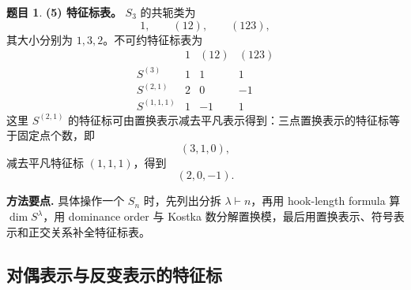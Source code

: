 \documentclass[a4paper]{ctexart}
\theoremstyle{definition}
\newtheorem{example}{题目}[section]
\theoremstyle{analysis}
\theoremstyle{plain}
\begin{document}
\begin{example}
\textbf{(5) 特征标表。}
\(S_3\) 的共轭类为
\[
  1,\qquad (12),\qquad (123),
\]
其大小分别为 \(1,3,2\)。不可约特征标表为
\[
\begin{array}{c|ccc}
 & 1 & (12) & (123)\\
\hline
S^{(3)} & 1 & 1 & 1\\
S^{(2,1)} & 2 & 0 & -1\\
S^{(1,1,1)} & 1 & -1 & 1
\end{array}
\]
这里 \(S^{(2,1)}\) 的特征标可由置换表示减去平凡表示得到：三点置换表示的特征标等于固定点个数，即
\[
  (3,1,0),
\]
减去平凡特征标 \((1,1,1)\)，得到
\[
  (2,0,-1).
\]

\textbf{方法要点.}
具体操作一个 \(S_n\) 时，先列出分拆 \(\lambda\vdash n\)，再用 hook-length formula 算 \(\dim S^\lambda\)，用 dominance order 与 Kostka 数分解置换模，最后用置换表示、符号表示和正交关系补全特征标表。
\end{example}

\subsection{对偶表示与反变表示的特征标}\label{subsec:problem-serre-contragredient-character}
\end{document}

